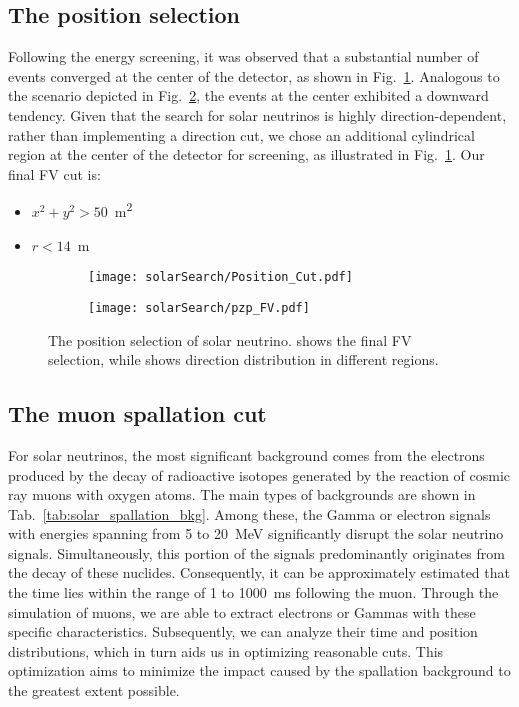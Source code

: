 \subsection{The position selection}
Following the energy screening, it was observed that a substantial number of events converged at the center of the detector, as shown in Fig.~\ref{fig:solar_pos_cut}. Analogous to the scenario depicted in Fig.~\ref{fig:solar_direction}, the events at the center exhibited a downward tendency. Given that the search for solar neutrinos is highly direction-dependent, rather than implementing a direction cut, we chose an additional cylindrical region at the center of the detector for screening, as illustrated in Fig.~\ref{fig:solar_pos_cut}. Our final FV cut is:
\begin{itemize}
	\item $x^2+y^2>50$~\si{m^2}
	\item $r<14$~\si{m}
\end{itemize}

\begin{figure}[htbp]
	\centering
	\begin{subfigure}{0.5\textwidth}
		\centering
		\texttt{[image: solarSearch/Position\_Cut.pdf]}
		\caption{}
		\label{fig:solar_pos_cut}
	\end{subfigure}%
	\begin{subfigure}{0.5\textwidth}
		\centering
		\texttt{[image: solarSearch/pzp\_FV.pdf]}
		\caption{}
		\label{fig:solar_direction}
	\end{subfigure}
	\caption{The position selection of solar neutrino.  shows the final FV selection, while  shows direction distribution in different regions.}
	\label{fig:solar_position_cut}
\end{figure}

\subsection{The muon spallation cut}
For solar neutrinos, the most significant background comes from the electrons produced by the decay of radioactive isotopes generated by the reaction of cosmic ray muons with oxygen atoms. The main types of backgrounds are shown in Tab.~\ref{tab:solar_spallation_bkg}. Among these, the Gamma or electron signals with energies spanning from 5 to \SI{20}{MeV} significantly disrupt the solar neutrino signals. Simultaneously, this portion of the signals predominantly originates from the decay of these nuclides. Consequently, it can be approximately estimated that the time lies within the range of 1 to \SI{1000}{ms} following the muon. Through the simulation of muons, we are able to extract electrons or Gammas with these specific characteristics. Subsequently, we can analyze their time and position distributions, which in turn aids us in optimizing reasonable cuts. This optimization aims to minimize the impact caused by the spallation background to the greatest extent possible.

